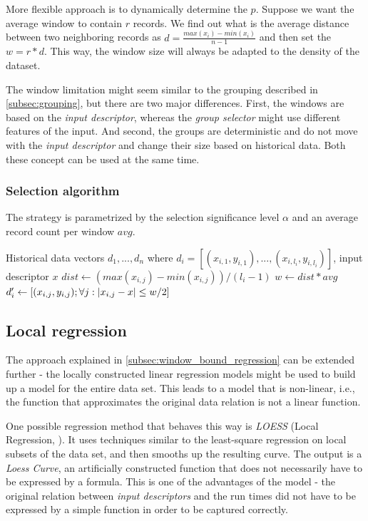 More flexible approach is to dynamically determine the $p$. Suppose we want the average window to contain $r$ records. We find out what is the average distance between two neighboring records as $d =  \frac{max(x_i) - min(x_i)}{n - 1}$ and then set the $w = r * d$. This way, the window size will always be adapted to the density of the dataset.

The window limitation might seem similar to the grouping described in \ref{subsec:grouping}, but there are two major differences. First, the windows are based on the \textit{input descriptor}, whereas the \textit{group selector} might use different features of the input. And second, the groups are deterministic and do not move with the \textit{input descriptor} and change their size based on historical data. Both these concept can be used at the same time.

\subsubsection{Selection algorithm}

The strategy is parametrized by the selection significance level $\alpha$ and an average record count per window $avg$.

\begin{algorithmic}[1] %
	\INPUT Historical data vectors $d_1,...,d_n$ where $d_i = [(x_{i,1}, y_{i,1}),...,(x_{i,l_i}, y_{i,l_i})]$, input descriptor $x$
	\State $dist \gets (max(x_{i,j}) - min(x_{i,j})) / (l_i-1)$
	\State $w \gets dist * avg$
	\State $d'_i \gets [(x_{i,j}, y_{i, j}); \forall j: \left|{x_{i,j} - x}\right| \leq w/2]$
	\EndFor
	\State {}
\end{algorithmic}

\subsection{Local regression}
\label{subsec:local_regression}

The approach explained in \ref{subsec:window_bound_regression} can be extended further - the locally constructed linear regression models might be used to build up a model for the entire data set. This leads to a model that is non-linear, i.e., the function that approximates the original data relation is not a linear function.

One possible regression method that behaves this way is \textit{LOESS} (Local Regression, \cite{cleveland_locally_1988,cleveland_regression_1988,cleveland_computational_1991}). It uses techniques similar to the least-square regression on local subsets of the data set, and then smooths up the resulting curve. The output is a \textit{Loess Curve}, an artificially constructed function that does not necessarily have to be expressed by a formula. This is one of the advantages of the model - the original relation between \textit{input descriptors} and the run times did not have to be expressed by a simple function in order to be captured correctly.

